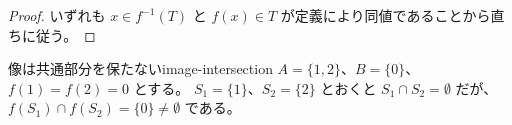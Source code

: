 \begin{proof}
いずれも $x \in f^{-1}(T)$ と $f(x) \in T$ が定義により同値であることから直ちに従う。
\end{proof}

\begin{example}{像は共通部分を保たない}{image-intersection}
$A = \{1, 2\}$、$B = \{0\}$、$f(1) = f(2) = 0$ とする。
$S_1 = \{1\}$、$S_2 = \{2\}$ とおくと $S_1 \cap S_2 = \emptyset$ だが、
$f(S_1) \cap f(S_2) = \{0\} \neq \emptyset$ である。
\end{example}
